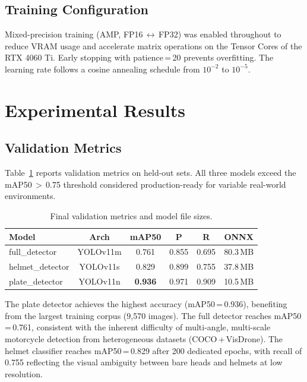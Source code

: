 \documentclass[10pt,twocolumn]{article}
\begin{document}
\subsection{Training Configuration}

Mixed-precision training (AMP, FP16\,$\leftrightarrow$\,FP32) was enabled
throughout to reduce VRAM usage and accelerate matrix operations on the Tensor
Cores of the RTX 4060 Ti. Early stopping with patience\,=\,20 prevents
overfitting. The learning rate follows a cosine annealing schedule from
$10^{-2}$ to $10^{-5}$.

\section{Experimental Results}

\subsection{Validation Metrics}

Table~\ref{tab:results} reports validation metrics on held-out sets.
All three models exceed the mAP50\,$>$\,0.75 threshold considered
production-ready for variable real-world environments.

\begin{table}[H]
\centering
\small
\caption{Final validation metrics and model file sizes.}
\label{tab:results}
\renewcommand{\arraystretch}{1.2}
\setlength{\tabcolsep}{4pt}
\begin{tabular}{lccccc}
\toprule
\textbf{Model} & \textbf{Arch} & \textbf{mAP50} & \textbf{P} & \textbf{R} & \textbf{ONNX}\\
\midrule
full\_detector   & YOLOv11m & 0.761 & 0.855 & 0.695 & 80.3\,MB\\
helmet\_detector & YOLOv11s & 0.829 & 0.899 & 0.755 & 37.8\,MB\\
plate\_detector  & YOLOv11n & \textbf{0.936} & 0.971 & 0.909 & 10.5\,MB\\
\bottomrule
\end{tabular}
\end{table}

\noindent
The plate detector achieves the highest accuracy (mAP50\,=\,0.936), benefiting
from the largest training corpus (9{,}570 images). The full detector reaches
mAP50\,=\,0.761, consistent with the inherent difficulty of multi-angle,
multi-scale motorcycle detection from heterogeneous datasets (COCO\,+\,VisDrone).
The helmet classifier reaches mAP50\,=\,0.829 after 200 dedicated epochs,
with recall of 0.755 reflecting the visual ambiguity between bare heads
and helmets at low resolution.
\end{document}

